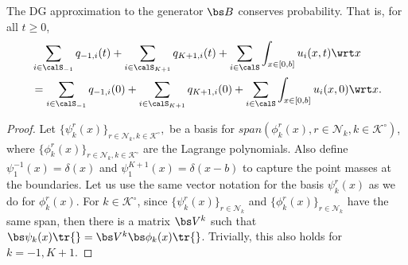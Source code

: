 \begin{cor}
	The DG approximation to the generator \(  \bs B\) conserves probability. That is, for all \(t\geq 0\), 
	\begin{align*}
	&\sum_{i\in\calS_{-1}}q_{{-1},i}(t)+\sum_{i\in\calS_{K+1}}q_{{K+1},i}(t)+\sum_{i\in\calS} \int_{x\in[0,b]}u_i(x,t)\wrt x 
	\\&= \sum_{i\in\calS_{-1}}q_{{-1},i}(0)+\sum_{i\in\calS_{K+1}}q_{{K+1},i}(0)+\sum_{i\in\calS} \int_{x\in[0,b]}u_i(x,0)\wrt x.
	\end{align*}
\end{cor}
\begin{proof}
Let \(\{\psi^r_k(x)\}_{r\in\mathcal N_k,k\in\mathcal K^\circ},\) be a basis for \(span(\phi^r_k(x),r\in\mathcal N_k,k\in\mathcal K^\circ)\), where \(\{\phi^r_k(x)\}_{r\in\mathcal N_k,k\in\mathcal K^\circ}\) are the Lagrange polynomials. Also define \(\psi_1^{-1}(x)=\delta(x)\) and \(\psi_1^{K+1}(x)=\delta(x-b)\) to capture the point masses at the boundaries. Let us use the same vector notation for the basis \(\psi^r_k(x)\) as we do for \(\phi^r_k(x)\). For \(k\in\mathcal K^\circ\), since \(\{\psi^r_k(x)\}_{r\in\mathcal N_k}\) and \(\{\phi^r_k(x)\}_{r\in\mathcal N_k}\) have the same span, then there is a matrix \(\bs V^k\) such that  \(\bs \psi_k(x)\tr{} = \bs V^k\bs \phi_k(x)\tr{}\). Trivially, this also holds for \(k={-1},{K+1}\). 


\end{proof}
